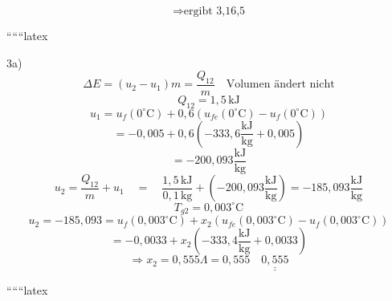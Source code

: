 \[
\Rightarrow \text{ergibt 3,16,5}
\]

``````latex


3a)
\[
\Delta E = (u_2 - u_1) m = \frac{Q_{12}}{m} \quad \text{Volumen ändert nicht}
\]
\[
Q_{12} = 1,5 \, \text{kJ}
\]
\[
u_1 = u_f(0^\circ \text{C}) + 0,6 \left( u_{fe}(0^\circ \text{C}) - u_f(0^\circ \text{C}) \right)
\]
\[
= -0,005 + 0,6 \left( -333,6 \frac{\text{kJ}}{\text{kg}} + 0,005 \right)
\]
\[
= -200,093 \frac{\text{kJ}}{\text{kg}}
\]
\[
u_2 = \frac{Q_{12}}{m} + u_1 \quad = \quad \frac{1,5 \, \text{kJ}}{0,1 \, \text{kg}} + (-200,093 \frac{\text{kJ}}{\text{kg}}) = -185,093 \frac{\text{kJ}}{\text{kg}}
\]
\[
T_{g2} = 0,003^\circ \text{C}
\]
\[
u_2 = -185,093 = u_f(0,003^\circ \text{C}) + x_2 \left( u_{fe}(0,003^\circ \text{C}) - u_f(0,003^\circ \text{C}) \right)
\]
\[
= -0,0033 + x_2 \left( -333,4 \frac{\text{kJ}}{\text{kg}} + 0,0033 \right)
\]
\[
\Rightarrow x_2 = 0,555 \Lambda = 0,555 \quad \underline{\underline{0,555}}
\]

``````latex


